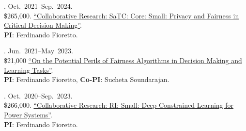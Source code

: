 
\beginList

\item
	. \hfill Oct.~2021--Sep.~2024.\\%
	\$265,000. 
	\href{https://www.nsf.gov/awardsearch/showAward?AWD_ID=2133169}
	{``Collaborative Research: SaTC: Core: Small: Privacy and Fairness in Critical Decision Making''}.\\
	{\bf PI}: Ferdinando Fioretto. 
	
	
\item {}. \hfill  Jun.~2021--May~2023.\\ %
	\$21,000 \href{www.nandofioretto.com}{``On the Potential Perils of Fairness Algorithms in Decision Making and Learning Tasks''}.\\
	 {\bf PI}: Ferdinando Fioretto, {\bf Co-PI}: Sucheta Soundarajan.
	 

\item
	. \hfill Oct.~2020--Sep.~2023.\\%
	\$266,000. 
	\href{https://www.nsf.gov/awardsearch/showAward?AWD_ID=2007164}{``Collaborative Research: RI: Small: Deep Constrained Learning for Power Systems''}.\\
	{\bf PI}: Ferdinando Fioretto. 
	





\endList